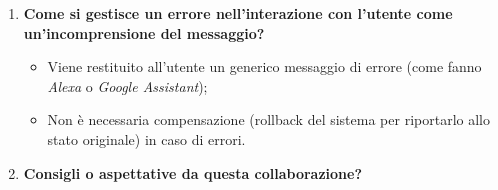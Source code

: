 \documentclass[11pt]{article}
\begin{document}
\begin{enumerate}
			\bigskip
			
			\item \textbf{Come si gestisce un errore nell'interazione con l'utente come un'incomprensione del messaggio?}
			
			\medskip
			
			\begin{itemize}
				\item Viene restituito all'utente un generico messaggio di errore (come fanno \textit{Alexa} o \textit{Google Assistant});
				\item Non è necessaria compensazione (rollback del sistema per riportarlo allo stato originale) in caso di errori.
			\end{itemize}

			\bigskip 
			
			\item \textbf{Consigli o aspettative da questa collaborazione?}
			
			\medskip


\end{enumerate}
\end{document}
